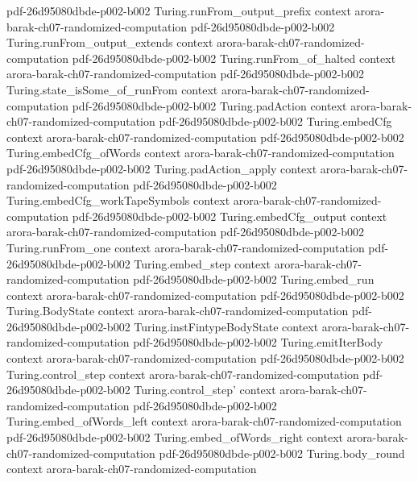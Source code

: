 \begin{theorem}
  {pdf-26d95080dbde-p002-b002}
\proofstep
  {Turing.runFrom_output_prefix}
  {context}
  {arora-barak-ch07-randomized-computation}
  {pdf-26d95080dbde-p002-b002}
\proofstep
  {Turing.runFrom_output_extends}
  {context}
  {arora-barak-ch07-randomized-computation}
  {pdf-26d95080dbde-p002-b002}
\proofstep
  {Turing.runFrom_of_halted}
  {context}
  {arora-barak-ch07-randomized-computation}
  {pdf-26d95080dbde-p002-b002}
\proofstep
  {Turing.state_isSome_of_runFrom}
  {context}
  {arora-barak-ch07-randomized-computation}
  {pdf-26d95080dbde-p002-b002}
\proofstep
  {Turing.padAction}
  {context}
  {arora-barak-ch07-randomized-computation}
  {pdf-26d95080dbde-p002-b002}
\proofstep
  {Turing.embedCfg}
  {context}
  {arora-barak-ch07-randomized-computation}
  {pdf-26d95080dbde-p002-b002}
\proofstep
  {Turing.embedCfg_ofWords}
  {context}
  {arora-barak-ch07-randomized-computation}
  {pdf-26d95080dbde-p002-b002}
\proofstep
  {Turing.padAction_apply}
  {context}
  {arora-barak-ch07-randomized-computation}
  {pdf-26d95080dbde-p002-b002}
\proofstep
  {Turing.embedCfg_workTapeSymbols}
  {context}
  {arora-barak-ch07-randomized-computation}
  {pdf-26d95080dbde-p002-b002}
\proofstep
  {Turing.embedCfg_output}
  {context}
  {arora-barak-ch07-randomized-computation}
  {pdf-26d95080dbde-p002-b002}
\proofstep
  {Turing.runFrom_one}
  {context}
  {arora-barak-ch07-randomized-computation}
  {pdf-26d95080dbde-p002-b002}
\proofstep
  {Turing.embed_step}
  {context}
  {arora-barak-ch07-randomized-computation}
  {pdf-26d95080dbde-p002-b002}
\proofstep
  {Turing.embed_run}
  {context}
  {arora-barak-ch07-randomized-computation}
  {pdf-26d95080dbde-p002-b002}
\proofstep
  {Turing.BodyState}
  {context}
  {arora-barak-ch07-randomized-computation}
  {pdf-26d95080dbde-p002-b002}
\proofstep
  {Turing.instFintypeBodyState}
  {context}
  {arora-barak-ch07-randomized-computation}
  {pdf-26d95080dbde-p002-b002}
\proofstep
  {Turing.emitIterBody}
  {context}
  {arora-barak-ch07-randomized-computation}
  {pdf-26d95080dbde-p002-b002}
\proofstep
  {Turing.control_step}
  {context}
  {arora-barak-ch07-randomized-computation}
  {pdf-26d95080dbde-p002-b002}
\proofstep
  {Turing.control_step'}
  {context}
  {arora-barak-ch07-randomized-computation}
  {pdf-26d95080dbde-p002-b002}
\proofstep
  {Turing.embed_ofWords_left}
  {context}
  {arora-barak-ch07-randomized-computation}
  {pdf-26d95080dbde-p002-b002}
\proofstep
  {Turing.embed_ofWords_right}
  {context}
  {arora-barak-ch07-randomized-computation}
  {pdf-26d95080dbde-p002-b002}
\proofstep
  {Turing.body_round}
  {context}
  {arora-barak-ch07-randomized-computation}

\end{theorem}
